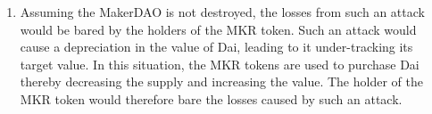 \documentclass[12pt]{exam}
\begin{document}
\begin{questions}
\begin{solution}
\begin{enumerate}[label=\textbf{\alph*.}]
  \item Assuming the MakerDAO is not destroyed, the losses from such an attack would be bared by the holders of the MKR token. Such an attack would cause a depreciation in the value of Dai, leading to it under-tracking its target value. In this situation, the MKR tokens are used to purchase Dai thereby decreasing the supply and increasing the value. The holder of the MKR token would therefore bare the losses caused by such an attack.
\end{enumerate}
\end{solution}

\end{questions}
\end{document}
